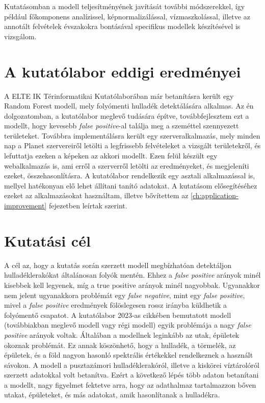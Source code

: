 Kutatásomban a modell teljesítményének javítását további módszerekkel, így például főkomponens analízissel, képnormalizálással, vízmaszkolással, illetve az annotált felvételek évszakokra bontásával specifikus modellek készítésével is vizsgálom.

\section{A kutatólabor eddigi eredményei}

A ELTE IK Térinformatikai Kutatólaborában már betanításra került egy Random Forest modell, mely folyómenti hulladék detektálására alkalmas. Az én dolgozatomban, a kutatólabor meglevő tudására építve, továbbfejlesztem ezt a modellt, hogy kevesebb \textit{false positive}-al találja meg a szeméttel szennyezett területeket. Továbbra implementálásra került egy szerveralkalmazás, mely minden nap a Planet szervereiről letölti a legfrissebb felvételeket a vizsgált területekről, és lefuttatja ezeken a képeken az akkori modellt. Ezen felül készült egy webalkalmazás is, ami erről a szerverről letölti az eredményeket, és megjeleníti ezeket, összehasonlításra. A kutatólabor rendelkezik egy asztali alkalmazással is, mellyel hatékonyan elő lehet állítani tanító adatokat. A kutatásom elősegítéséhez ezeket az alkalmazásokat használtam, illetve bővítettem az \ref{ch:application-improvement} fejezetben leírtak szerint.

\section{Kutatási cél}
\label{ch:goals}

A cél az, hogy a kutatás során szerzett modell megbízhatóan detektáljon hulladéklerakókat általánosan folyók mentén. Ehhez a \textit{false positive} arányok minél kisebbek kell legyenek, míg a true positive arányok minél nagyobbak. Ugyanakkor nem jelent ugyanakkora problémát egy \textit{false negative}, mint egy \textit{false positive}, mivel a \textit{false positive} eredmények fölöslegesen rossz irányba küldhetik a folyómentő csapatot. 
A kutatólabor 2023-as cikkében bemutatott modell (továbbiakban meglevő modell vagy régi modell) \cite{magyar2023} egyik problémája a nagy \textit{false positive} arányok voltak. Általában a modellnek leginkább az utak, épületek okoznak problémát. Ez annak köszönhető, hogy a hulladék, a törmelék, az épületek, és a föld nagyon hasonló spektrális értékekkel rendelkeznek a használt sávokon. A modell a pusztazámori hulladéklerakóról, illetve a kiskörei víztárolóról szerzett adatokkal volt betanítva. Ezért a következő lépés több adaton betanítani a modellt, nagy figyelmet fektetve arra, hogy az adathalmaz tartalmazzon bőven utakat, épületeket, és más adatokat, amik hasonlítanak a hulladékra. 

